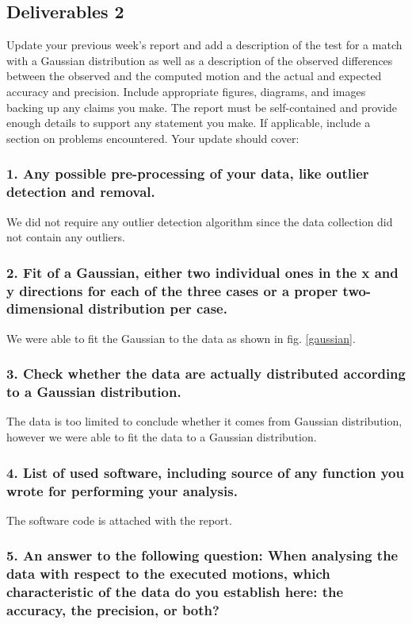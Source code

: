 \sectionLine
\subsection*{Deliverables 2}
Update your previous week’s report and add a description of the test for a match with a Gaussian distribution as well as a description of the observed differences between the observed and the computed motion and the actual and expected accuracy and precision. Include appropriate figures, diagrams, and images backing up any claims you make. The report must be self-contained and provide enough details to support any statement you make. If applicable, include a section on problems encountered. Your update should cover:

\subsubsection*{1. Any possible pre-processing of your data, like outlier detection and removal.}
We did not require any outlier detection algorithm since the data collection did not contain any outliers.

\subsubsection*{2. Fit of a Gaussian, either two individual ones in the x and y directions for each of the three cases or a proper two-dimensional distribution per case.}
We were able to fit the Gaussian to the data as shown in fig. \ref{gaussian}.

\subsubsection*{3. Check whether the data are actually distributed according to a Gaussian distribution.}
The data is too limited to conclude whether it comes from Gaussian distribution, however we were able to fit the data to a Gaussian distribution.

\subsubsection*{4. List of used software, including source of any function you wrote for performing your analysis.}
The software code is attached with the report.

\subsubsection*{5. An answer to the following question: When analysing the data with respect to the executed motions, which characteristic of the data do you establish here: the accuracy, the precision, or both?}

